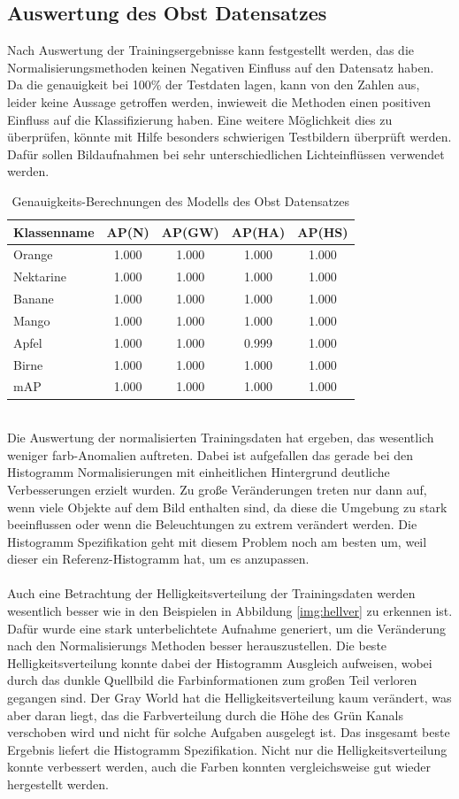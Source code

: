\documentclass[a4paper,12pt,oneside]{article}
\begin{document}
\subsection{Auswertung des Obst Datensatzes}
Nach Auswertung der Trainingsergebnisse kann festgestellt werden, das die Normalisierungsmethoden keinen Negativen Einfluss auf den Datensatz haben. Da die genauigkeit bei 100\% der Testdaten lagen, kann von den Zahlen aus, leider keine Aussage getroffen werden, inwieweit die Methoden einen positiven Einfluss auf die Klassifizierung haben. Eine weitere Möglichkeit dies zu überprüfen, könnte mit Hilfe besonders schwierigen Testbildern überprüft werden. Dafür sollen Bildaufnahmen bei sehr unterschiedlichen Lichteinflüssen verwendet werden.
\begin{table}
[h]
\caption{Genauigkeits-Berechnungen des Modells des Obst Datensatzes}
\centering
\begin{tabular}{|l|c|c|c|c|}
\hline
Klassenname & AP(N) & AP(GW) & AP(HA) & AP(HS)\\
\hline
Orange & 1.000 & 1.000 & 1.000 & 1.000\\
Nektarine & 1.000 & 1.000 & 1.000 & 1.000\\
Banane & 1.000 & 1.000 & 1.000 & 1.000\\
Mango & 1.000 & 1.000 & 1.000 & 1.000\\
Apfel & 1.000 & 1.000 & 0.999 & 1.000\\
Birne & 1.000 & 1.000 & 1.000 & 1.000\\
\hline
mAP & 1.000 & 1.000 & 1.000 & 1.000\\
\hline
\end{tabular}
\end{table}\\
Die Auswertung der normalisierten Trainingsdaten hat ergeben, das wesentlich weniger farb-Anomalien auftreten. Dabei ist aufgefallen das gerade bei den Histogramm Normalisierungen mit einheitlichen Hintergrund deutliche Verbesserungen erzielt wurden. Zu große Veränderungen treten nur dann auf, wenn viele Objekte auf dem Bild enthalten sind, da diese die Umgebung zu stark beeinflussen oder wenn die Beleuchtungen zu extrem verändert werden. Die Histogramm Spezifikation geht mit diesem Problem noch am besten um, weil dieser ein Referenz-Histogramm hat, um es anzupassen. \\\\
Auch eine Betrachtung der Helligkeitsverteilung der Trainingsdaten werden wesentlich besser wie in den Beispielen in Abbildung \ref{img:hellver} zu erkennen ist. Dafür wurde eine stark unterbelichtete Aufnahme generiert, um die Veränderung nach den Normalisierungs Methoden besser herauszustellen. Die beste Helligkeitsverteilung konnte dabei der Histogramm Ausgleich aufweisen, wobei durch das dunkle Quellbild die Farbinformationen zum großen Teil verloren gegangen sind. Der Gray World hat die Helligkeitsverteilung kaum verändert, was aber daran liegt, das die Farbverteilung durch die Höhe des Grün Kanals verschoben wird und nicht für solche Aufgaben ausgelegt ist. Das insgesamt beste Ergebnis liefert die Histogramm Spezifikation. Nicht nur die Helligkeitsverteilung konnte verbessert werden, auch die Farben konnten vergleichsweise gut wieder hergestellt werden.
  \newpage
\end{document}
